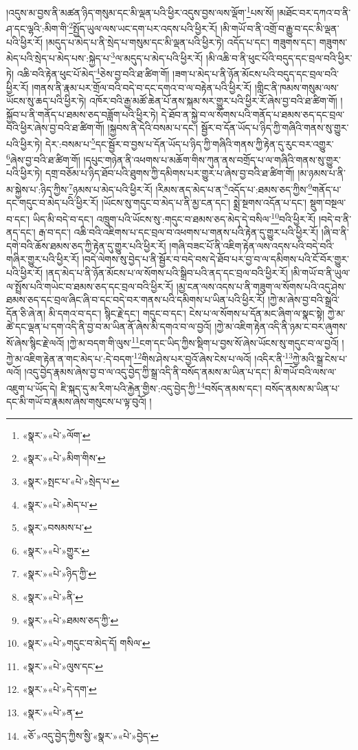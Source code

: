 །འདུས་མ་བྱས་ནི་མཚན་ཉིད་གསུམ་དང་མི་ལྡན་པའི་ཕྱིར་འདུས་བྱས་ལས་ལྡོག་\footnote{«སྣར་»«པེ་»ལོག་}པས་སོ། །མཐོང་བར་དཀའ་བ་ནི་ཤ་དང་ལྷའི་:མིག་གི་\footnote{«སྣར་»«པེ་»མིག་གིས་}སྤྱོད་ཡུལ་ལས་ཡང་དག་པར་འདས་པའི་ཕྱིར་རོ། །མི་གཡོ་བ་ནི་འགྲོ་བ་རྒྱུ་བ་དང་མི་ལྡན་པའི་ཕྱིར་རོ། །མདུད་པ་མེད་པ་ནི་སྲེད་པ་གསུམ་དང་མི་ལྡན་པའི་ཕྱིར་ཏེ། འདོད་པ་དང་། གཟུགས་དང་། གཟུགས་མེད་པའི་སྲེད་པ་མེད་པས་:སྐྱེད་པ་\footnote{«སྣར་»སྤང་པ་«པེ་»སྲེད་པ་}ལ་མདུད་པ་མེད་པའི་ཕྱིར་རོ། །མི་འཆི་བ་ནི་ཕུང་པོའི་བདུད་དང་བྲལ་བའི་ཕྱིར་ཏེ། འཆི་བའི་རྟེན་ཕུང་པོ་མེད་\footnote{«སྣར་»«པེ་»མེད་པ་}ཅེས་བྱ་བའི་ཐ་ཚིག་གོ། །ཟག་པ་མེད་པ་ནི་ཉོན་མོངས་པའི་བདུད་དང་བྲལ་བའི་ཕྱིར་རོ། །གནས་ནི་རྣམ་པར་གྲོལ་བའི་བདེ་བ་དང་དགའ་བ་ལ་བརྟེན་པའི་ཕྱིར་རོ། །གླིང་ནི་ཁམས་གསུམ་ལས་ཡོངས་སུ་ཆད་པའི་ཕྱིར་ཏེ། འཁོར་བའི་རྒྱ་མཚོ་ཆེན་པོ་ནས་སྐམ་སར་གྱུར་པའི་ཕྱིར་རོ་ཞེས་བྱ་བའི་ཐ་ཚིག་གོ། །སྐྱོབ་པ་ནི་གནོད་པ་ཐམས་ཅད་བཟློག་པའི་ཕྱིར་ཏེ། དེ་ཐོབ་ན་སྐྱེ་བ་ལ་སོགས་པའི་གནོད་པ་ཐམས་ཅད་དང་བྲལ་བའི་ཕྱིར་ཞེས་བྱ་བའི་ཐ་ཚིག་གོ། །སྐྱབས་ནི་དེའི་བསམ་པ་དང་། སྦྱོར་བ་དོན་ཡོད་པ་ཉིད་ཀྱི་གཞིའི་གནས་སུ་གྱུར་པའི་ཕྱིར་ཏེ། དེར་:བསམ་པ་\footnote{«སྣར་»བསམས་པ་}དང་སྦྱོར་བ་བྱས་པ་དོན་ཡོད་པ་ཉིད་ཀྱི་གཞིའི་གནས་ཀྱི་རྟེན་དུ་རུང་བར་འགྱུར་\footnote{«སྣར་»«པེ་»གྱུར་}ཞེས་བྱ་བའི་ཐ་ཚིག་གོ། །དཔུང་གཉེན་ནི་འཕགས་པ་མཆོག་གིས་ཀུན་ནས་བགྲོད་པ་ལ་གཞིའི་གནས་སུ་གྱུར་པའི་ཕྱིར་ཏེ། དགྲ་བཅོམ་པ་ཉིད་ཐོབ་པའི་ཐུགས་ཀྱི་དམིགས་པར་གྱུར་པ་ཞེས་བྱ་བའི་ཐ་ཚིག་གོ། །མ་ཉམས་པ་ནི་མ་སྐྱེས་པ་:ཉིད་ཀྱིས་\footnote{«སྣར་»«པེ་»ཉིད་ཀྱི་}ཉམས་པ་མེད་པའི་ཕྱིར་རོ། །རིམས་ནད་མེད་པ་ན་\footnote{«སྣར་»«པེ་»ནི་}འདོད་པ་:ཐམས་ཅད་ཀྱིས་\footnote{«སྣར་»«པེ་»ཐམས་ཅད་ཀྱི་}གནོད་པ་དང་གདུང་བ་མེད་པའི་ཕྱིར་རོ། །ཡོངས་སུ་གདུང་བ་མེད་པ་ནི་མྱ་ངན་དང་། སྨྲེ་སྔགས་འདོན་པ་དང་། སྡུག་བསྔལ་བ་དང་། ཡིད་མི་བདེ་བ་དང་། འཁྲུག་པའི་ཡོངས་སུ་:གདུང་བ་ཐམས་ཅད་མེད་དེ་བསིལ་\footnote{«སྣར་»«པེ་»གདུང་བ་མེད་དོ། གསིལ་}བའི་ཕྱིར་རོ། །བདེ་བ་ནི་ནད་དང་། རྒ་བ་དང་། འཆི་བའི་འཇིགས་པ་དང་བྲལ་བ་འཕགས་པ་གནས་པའི་རྟེན་དུ་གྱུར་པའི་ཕྱིར་རོ། །ཞི་བ་ནི་དགེ་བའི་ཆོས་ཐམས་ཅད་ཀྱི་རྟེན་དུ་གྱུར་པའི་ཕྱིར་རོ། །གཞི་བཟང་པོ་ནི་འཇིག་རྟེན་ལས་འདས་པའི་བདེ་བའི་གཞིར་གྱུར་པའི་ཕྱིར་རོ། །བདེ་ལེགས་སུ་བྱེད་པ་ནི་སྦྱོར་བ་བདེ་བས་དེ་ཐོབ་པར་བྱ་བ་ལ་དམིགས་པའི་ངོ་བོར་གྱུར་པའི་ཕྱིར་རོ། །ནད་མེད་པ་ནི་ཉོན་མོངས་པ་ལ་སོགས་པའི་སྒྲིབ་པའི་ནད་དང་བྲལ་བའི་ཕྱིར་རོ། །མི་གཡོ་བ་ནི་ཡུལ་ལ་སྤྲོས་པའི་གཡེང་བ་ཐམས་ཅད་དང་བྲལ་བའི་ཕྱིར་རོ། །མྱ་ངན་ལས་འདས་པ་ནི་གཟུག་ལ་སོགས་པའི་འདུ་ཤེས་ཐམས་ཅད་དང་བྲལ་ཞིང་ཞི་བ་དང་བདེ་བར་གནས་པའི་དམིགས་པ་ཡིན་པའི་ཕྱིར་རོ། །ཀྱེ་མ་ཞེས་བྱ་བའི་སྒྲའི་དོན་ཅི་ཞེ་ན། མི་དགའ་བ་དང་། སྙིང་རྗེ་དང་། གདུང་བ་དང་། ངེས་པ་ལ་སོགས་པ་དོན་མང་ཞིག་ལ་སྣང་སྟེ། ཀྱེ་མ་ཚེ་དང་ལྡན་པ་དག་འདི་ནི་བྱ་བ་མ་ཡིན་ནོ་ཞེས་མི་དགའ་བ་ལ་བྱའོ། །ཀྱེ་མ་འཇིག་རྟེན་འདི་ནི་ཉམ་ང་བར་ཞུགས་སོ་ཞེས་སྙིང་རྗེ་ལའོ། །ཀྱེ་མ་བདག་གི་ལུས་\footnote{«སྣར་»«པེ་»ལུས་དང་}ངག་དང་ཡིད་ཀྱིས་སྡིག་པ་བྱས་སོ་ཞེས་ཡོངས་སུ་གདུང་བ་ལ་བྱའོ། །ཀྱེ་མ་འཇིག་རྟེན་ན་གང་མེད་པ་:དེ་བདག་\footnote{«སྣར་»«པེ་»དེ་དག་}གིས་ཤེས་པར་བྱའོ་ཞེས་ངེས་པ་ལའོ། །འདིར་ནི་\footnote{«སྣར་»«པེ་»ན་}ཀྱེ་མའི་སྒྲ་ངེས་པ་ལའོ། །འདུ་བྱེད་རྣམས་ཞེས་བྱ་བ་ལ་འདུ་བྱེད་ཀྱི་སྒྲ་འདི་ནི་བསོད་ནམས་མ་ཡིན་པ་དང་། མི་གཡོ་བའི་ལས་ལ་འཇུག་པ་ཡོད་དེ། ཇི་སྐད་དུ་མ་རིག་པའི་རྐྱེན་གྱིས་:འདུ་བྱེད་ཀྱི་\footnote{«ཅོ་»འདུ་བྱེད་ཀྱིས་ྱིས་«སྣར་»«པེ་»བྱེད་}བསོད་ནམས་དང་། བསོད་ནམས་མ་ཡིན་པ་དང་མི་གཡོ་བ་རྣམས་ཞེས་གསུངས་པ་ལྟ་བུའོ། །
